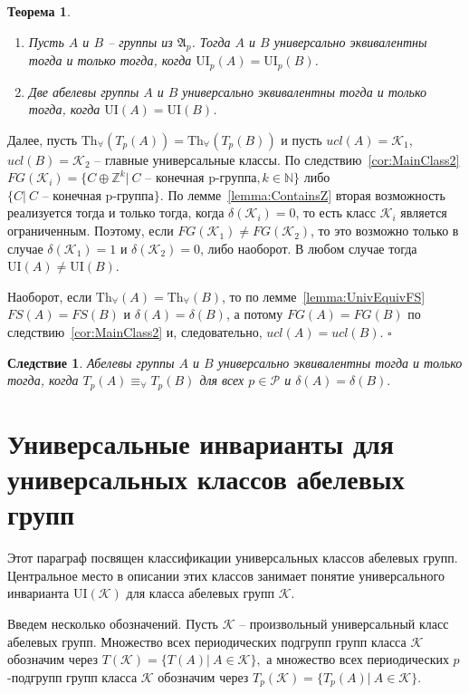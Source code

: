 \documentclass[a4paper,11pt,twoside]{article}
\newtheorem{theorem}{Теорема}[section]
\newtheorem{corollary}{Следствие}[section]
\def\proof{{\noindent{\bf Доказательство.}} }
\def\A{{\mathfrak{A}}}
\def\K{{\mathcal{K}}}
\def\P{{\mathcal{P}}}
\def\Z{{\mathbb{Z}}}
\def\N{{\mathbb{N}}}
\def\Tha{{\mathrm{Th}_\forall}}
\def\ui{{\mathrm{UI}}}
\begin{document}
\begin{theorem}\label{th:UnivEquivOfGroups}
\begin{enumerate}
\item Пусть $A$ и $B$ -- группы из $\A_p$. Тогда $A$ и $B$ универсально эквивалентны тогда и только тогда, когда $\ui_p(A) = \ui_p(B)$.
\item Две абелевы группы $A$ и $B$ универсально эквивалентны тогда и только тогда, когда $\ui(A) = \ui(B)$.
\end{enumerate}
\end{theorem}


\proof Далее, пусть $\Tha(T_p(A)) = \Tha(T_p(B))$ и пусть $ucl(A) = \K_1$, $ucl(B) = \K_2$ -- главные универсальные классы. По следствию~\ref{cor:MainClass2} $FG(\K_i) = \{C \oplus \Z^k | \ C \text{ -- конечная p-группа}, k \in \N\}$ либо $\{C | \ C \text{ -- конечная p-группа} \}$. По лемме~\ref{lemma:ContainsZ} вторая возможность реализуется тогда и только тогда, когда $\delta(\K_i) = 0$, то есть класс $\K_i$ является ограниченным. Поэтому, если $FG(\K_1) \neq FG(\K_2)$, то это возможно только в случае $\delta(\K_1) = 1$ и $\delta(\K_2) = 0$, либо наоборот. В любом случае тогда $\ui(A) \neq \ui(B)$.

Наоборот, если $\Tha(A) = \Tha(B)$, то по лемме~\ref{lemma:UnivEquivFS} $FS(A) = FS(B)$ и $\delta(A) = \delta(B)$, а потому $FG(A) = FG(B)$ по следствию~\ref{cor:MainClass2} и, следовательно, $ucl(A) = ucl(B)$. $\square$


\begin{corollary}\label{cor:UnivEquivTpA_TpB}
Абелевы группы $A$ и $B$ универсально эквивалентны тогда и только тогда, когда $T_p(A) \equiv_\forall T_p(B)$ для всех $p \in \P$ и $\delta(A) = \delta(B).$
\end{corollary}







\section{Универсальные инварианты для универсальных классов абелевых групп}

Этот параграф посвящен классификации универсальных классов абелевых групп. Центральное место в описании этих классов занимает понятие универсального инварианта $\ui(\K)$ для класса абелевых групп $\K$. 

Введем несколько обозначений. Пусть $\K$ -- произвольный универсальный класс абелевых групп. Множество всех периодических подгрупп групп класса $\K$ обозначим через $T(\K) = \{ T(A) | \ A \in \K\},$ а множество всех периодических $p$-подгрупп групп класса $\K$ обозначим через $T_p(\K) = \{ T_p(A) | \ A \in \K\}.$
\end{document}
